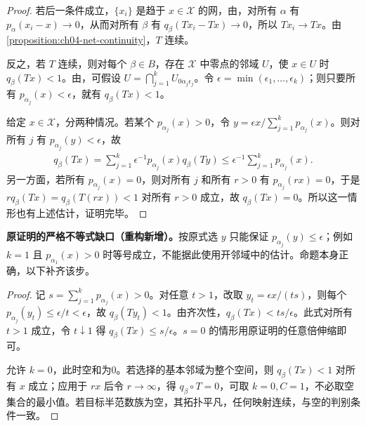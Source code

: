 \documentclass[../../main.tex]{subfiles}
\begin{document}
\begin{proof}
若后一条件成立，$\{x_i\}$ 是趋于 $x\in\mathcal X$ 的网，由，对所有 $\alpha$ 有 $p_\alpha(x_i-x)\to0$，从而对所有 $\beta$ 有 $q_\beta(Tx_i-Tx)\to0$，所以 $Tx_i\to Tx$。由\cref{proposition:ch04-net-continuity}，$T$ 连续。

反之，若 $T$ 连续，则对每个 $\beta\in B$，存在 $\mathcal X$ 中零点的邻域 $U$，使 $x\in U$ 时 $q_\beta(Tx)<1$。由，可假设 $U=\bigcap_{j=1}^kU_{0\alpha_j\epsilon_j}$。令 $\epsilon=\min(\epsilon_1,\ldots,\epsilon_k)$；则只要所有 $p_{\alpha_j}(x)<\epsilon$，就有 $q_\beta(Tx)<1$。

给定 $x\in\mathcal X$，分两种情况。若某个 $p_{\alpha_j}(x)>0$，令 $y=\epsilon x/\sum_{j=1}^kp_{\alpha_j}(x)$。则对所有 $j$ 有 $p_{\alpha_j}(y)<\epsilon$，故
\begin{align*}
q_\beta(Tx)=\sum_{j=1}^k\epsilon^{-1}p_{\alpha_j}(x)q_\beta(Ty)
\le\epsilon^{-1}\sum_{j=1}^kp_{\alpha_j}(x).
\end{align*}
另一方面，若所有 $p_{\alpha_j}(x)=0$，则对所有 $j$ 和所有 $r>0$ 有 $p_{\alpha_j}(rx)=0$，于是 $rq_\beta(Tx)=q_\beta(T(rx))<1$ 对所有 $r>0$ 成立，故 $q_\beta(Tx)=0$。所以这一情形也有上述估计，证明完毕。
\end{proof}
\begin{remark}
\textbf{原证明的严格不等式缺口（重构新增）。}按原式选 $y$ 只能保证 $p_{\alpha_j}(y)\le\epsilon$；例如 $k=1$ 且 $p_{\alpha_1}(x)>0$ 时等号成立，不能据此使用开邻域中的估计。命题本身正确，以下补齐该步。
\end{remark}
\begin{proof}
记 $s=\sum_{j=1}^kp_{\alpha_j}(x)>0$。对任意 $t>1$，改取 $y_t=\epsilon x/(ts)$，则每个 $p_{\alpha_j}(y_t)\le\epsilon/t<\epsilon$，故 $q_\beta(Ty_t)<1$。由齐次性，$q_\beta(Tx)<ts/\epsilon$。此式对所有 $t>1$ 成立，令 $t\downarrow1$ 得 $q_\beta(Tx)\le s/\epsilon$。$s=0$ 的情形用原证明的任意倍伸缩即可。

允许 $k=0$，此时空和为0。若选择的基本邻域为整个空间，则 $q_\beta(Tx)<1$ 对所有 $x$ 成立；应用于 $rx$ 后令 $r\to\infty$，得 $q_\beta\circ T=0$，可取 $k=0,C=1$，不必取空集合的最小值。若目标半范数族为空，其拓扑平凡，任何映射连续，与空的判别条件一致。
\end{proof}
\end{document}
